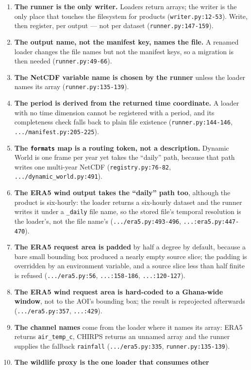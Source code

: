 \documentclass[11pt,a4paper]{article}
\newcommand{\code}[1]{\texttt{#1}}
\begin{document}
\begin{enumerate}
\item \textbf{The runner is the only writer.} Loaders return arrays; the writer
is the only place that touches the filesystem for products
(\code{writer.py:12-53}). Write, then register, per output --- not per
dataset (\code{runner.py:147-159}).
\item \textbf{The output name, not the manifest key, names the file.} A
renamed loader changes the file names but not the manifest keys, so a
migration is then needed (\code{runner.py:49-66}).
\item \textbf{The NetCDF variable name is chosen by the runner} unless the
loader names its array (\code{runner.py:135-139}).
\item \textbf{The period is derived from the returned time coordinate.} A
loader with no time dimension cannot be registered with a period, and its
completeness check falls back to plain file existence
(\code{runner.py:144-146}, \code{.../manifest.py:205-225}).
\item \textbf{The \code{formats} map is a routing token, not a
description.} Dynamic World is one frame per year yet takes the ``daily''
path, because that path writes one multi-year NetCDF
(\code{registry.py:76-82}, \code{.../dynamic\_world.py:491}).
\item \textbf{The ERA5 wind output takes the ``daily'' path too}, although the
product is six-hourly: the loader returns a six-hourly dataset and the
runner writes it under a \code{\_daily} file name, so the stored file's
temporal resolution is the loader's, not the file name's
(\code{.../era5.py:493-496}, \code{...:era5.py:447-470}).
\item \textbf{The ERA5 request area is padded} by half a degree by default,
because a bare small bounding box produced a nearly empty source slice; the
padding is overridden by an environment variable, and a source slice less
than half finite is refused (\code{.../era5.py:56}, \code{...:158-186},
\code{...:120-127}).
\item \textbf{The ERA5 wind request area is hard-coded to a Ghana-wide
window}, not to the AOI's bounding box; the result is reprojected afterwards
(\code{.../era5.py:357}, \code{...:429}).
\item \textbf{The channel names} come from the loader where it names its
array: ERA5 returns \code{air\_temp\_c}, CHIRPS returns an unnamed array and
the runner supplies the fallback \code{rainfall}
(\code{.../era5.py:335}, \code{runner.py:135-139}).
\item \textbf{The wildlife proxy is the one loader that consumes other
}
\end{enumerate}
\end{document}
